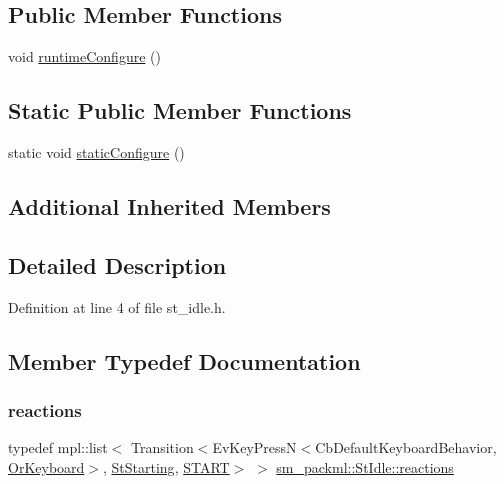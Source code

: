 \subsection*{Public Member Functions}
\begin{DoxyCompactItemize}
\item 
void \hyperlink{structsm__packml_1_1StIdle_ae4ae54c43e2ee7372a753eda8cd9abac}{runtime\+Configure} ()
\end{DoxyCompactItemize}
\subsection*{Static Public Member Functions}
\begin{DoxyCompactItemize}
\item 
static void \hyperlink{structsm__packml_1_1StIdle_a4fe82f96b9329edc9a5a450e1590c11e}{static\+Configure} ()
\end{DoxyCompactItemize}
\subsection*{Additional Inherited Members}


\subsection{Detailed Description}


Definition at line 4 of file st\+\_\+idle.\+h.



\subsection{Member Typedef Documentation}
\mbox{\label{structsm__packml_1_1StIdle_abcbcf0e43c5a244b09d3a449e51e9524}} 
\subsubsection{\texorpdfstring{reactions}{reactions}}
{\footnotesize\ttfamily typedef mpl\+::list$<$ Transition$<$Ev\+Key\+PressN$<$Cb\+Default\+Keyboard\+Behavior, \hyperlink{classsm__packml_1_1OrKeyboard}{Or\+Keyboard}$>$, \hyperlink{structsm__packml_1_1StStarting}{St\+Starting}, \hyperlink{structsm__packml_1_1StIdle_1_1START}{S\+T\+A\+RT}$>$ $>$ \hyperlink{structsm__packml_1_1StIdle_abcbcf0e43c5a244b09d3a449e51e9524}{sm\+\_\+packml\+::\+St\+Idle\+::reactions}}



